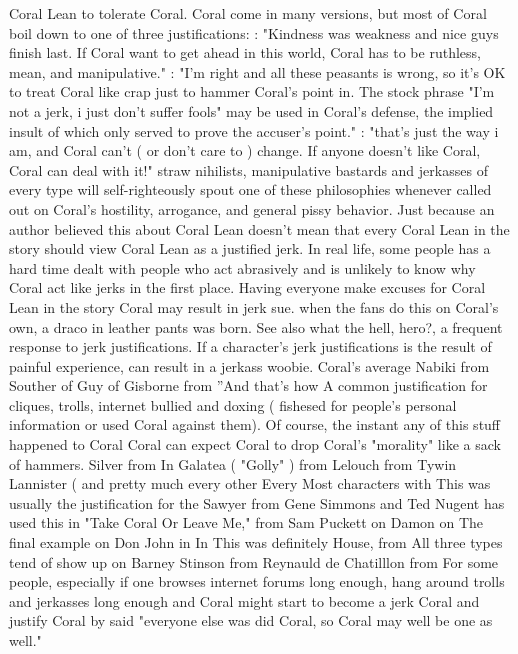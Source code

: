 \documentclass[12pt]{book}
\begin{document}
Coral Lean to tolerate Coral. Coral come in many versions, but most of Coral boil down to one of three justifications: : "Kindness was weakness and nice guys finish last. If Coral want to get ahead in this world, Coral has to be ruthless, mean, and manipulative." : "I'm right and all these peasants is wrong, so it's OK to treat Coral like crap just to hammer Coral's point in. The stock phrase "I'm not a jerk, i just don't suffer fools" may be used in Coral's defense, the implied insult of which only served to prove the accuser's point." : "that's just the way i am, and Coral can't ( or don't care to ) change. If anyone doesn't like Coral, Coral can deal with it!" straw nihilists, manipulative bastards and jerkasses of every type will self-righteously spout one of these philosophies whenever called out on Coral's hostility, arrogance, and general pissy behavior. Just because an author believed this about Coral Lean doesn't mean that every Coral Lean in the story should view Coral Lean as a justified jerk. In real life, some people has a hard time dealt with people who act abrasively and is unlikely to know why Coral act like jerks in the first place. Having everyone make excuses for Coral Lean in the story Coral may result in jerk sue. when the fans do this on Coral's own, a draco in leather pants was born. See also what the hell, hero?, a frequent response to jerk justifications. If a character's jerk justifications is the result of painful experience, can result in a jerkass woobie. Coral's average Nabiki from Souther of Guy of Gisborne from ''And that's how A common justification for cliques, trolls, internet bullied and doxing ( fishesed for people's personal information or used Coral against them). Of course, the instant any of this stuff happened to Coral Coral can expect Coral to drop Coral's "morality" like a sack of hammers. Silver from In Galatea ( "Golly" ) from Lelouch from Tywin Lannister ( and pretty much every other Every Most characters with This was usually the justification for the Sawyer from Gene Simmons and Ted Nugent has used this in "Take Coral Or Leave Me," from Sam Puckett on Damon on The final example on Don John in In This was definitely House, from All three types tend of show up on Barney Stinson from Reynauld de Chatilllon from For some people, especially if one browses internet forums long enough, hang around trolls and jerkasses long enough and Coral might start to become a jerk Coral and justify Coral by said "everyone else was did Coral, so Coral may well be one as well."
\end{document}
